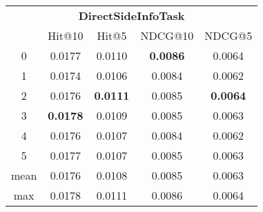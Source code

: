 \documentclass{article}
\begin{document}
 

\begin{tabular}{c|cccc}

\multicolumn{5}{c}{\textbf{DirectSideInfoTask}} \\
\noalign{\smallskip}
\noalign{\smallskip}
\toprule
\multicolumn{1}{c}{Template ID}	&	\multicolumn{1}{|c}{Hit@10}	&	\multicolumn{1}{c}{Hit@5}	&	\multicolumn{1}{c}{NDCG@10}	&	\multicolumn{1}{c}{NDCG@5}\\
\midrule
0	&	0.0177	&	0.0110	&	\textbf{0.0086}	&	0.0064\\
1	&	0.0174	&	0.0106	&	0.0084	&	0.0062\\
2	&	0.0176	&	\textbf{0.0111}	&	0.0085	&	\textbf{0.0064}\\
3	&	\textbf{0.0178}	&	0.0109	&	0.0085	&	0.0063\\
4	&	0.0176	&	0.0107	&	0.0084	&	0.0062\\
5	&	0.0177	&	0.0107	&	0.0085	&	0.0063\\
\midrule
mean	&	0.0176	&	0.0108	&	0.0085	&	0.0063\\
max	&	0.0178	&	0.0111	&	0.0086	&	0.0064\\
\bottomrule

\end{tabular}
\end{document}
